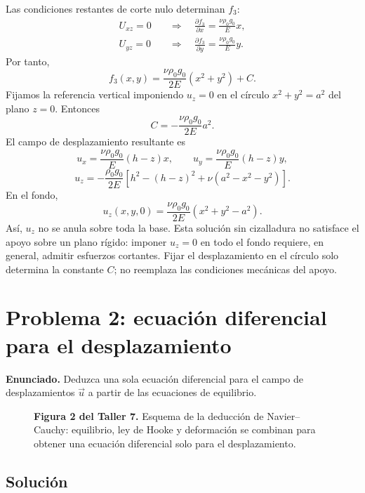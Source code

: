 \documentclass[a4paper]{article}
\begin{document}
Las condiciones restantes de corte nulo determinan $f_3$:
\[
\begin{aligned}
U_{xz}=0
&\quad\Longrightarrow\quad
\frac{\partial f_3}{\partial x}=\frac{\nu\rho_0g_0}{E}x,\\
U_{yz}=0
&\quad\Longrightarrow\quad
\frac{\partial f_3}{\partial y}=\frac{\nu\rho_0g_0}{E}y.
\end{aligned}
\]
Por tanto,
\[
f_3(x,y)=\frac{\nu\rho_0g_0}{2E}(x^2+y^2)+C.
\]
Fijamos la referencia vertical imponiendo $u_z=0$ en el círculo $x^2+y^2=a^2$ del plano $z=0$. Entonces
\[
C=-\frac{\nu\rho_0g_0}{2E}a^2.
\]
El campo de desplazamiento resultante es
\[
\boxed{u_x=\frac{\nu\rho_0g_0}{E}(h-z)x},
\qquad
\boxed{u_y=\frac{\nu\rho_0g_0}{E}(h-z)y},
\]
\[
\boxed{u_z=-\frac{\rho_0g_0}{2E}
\left[h^2-(h-z)^2+\nu(a^2-x^2-y^2)\right]}.
\]
En el fondo,
\[
u_z(x,y,0)=\frac{\nu\rho_0g_0}{2E}(x^2+y^2-a^2).
\]
Así, $u_z$ no se anula sobre toda la base. Esta solución sin cizalladura no satisface el apoyo sobre un plano rígido: imponer $u_z=0$ en todo el fondo requiere, en general, admitir esfuerzos cortantes. Fijar el desplazamiento en el círculo solo determina la constante $C$; no reemplaza las condiciones mecánicas del apoyo.




\section{Problema 2: ecuación diferencial para el desplazamiento}

\textbf{Enunciado.} Deduzca una sola ecuación diferencial para el campo de desplazamientos $\vec u$ a partir de las ecuaciones de equilibrio.

\begin{figure}[H]
\centering

\par\medskip
\begin{minipage}{\textwidth}
\textbf{Figura 2 del Taller 7.} Esquema de la deducción de Navier--Cauchy: equilibrio, ley de Hooke y deformación se combinan para obtener una ecuación diferencial solo para el desplazamiento.
\end{minipage}
\end{figure}

\subsection{Solución}
\end{document}
